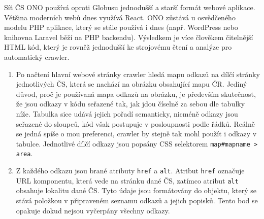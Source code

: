 Síť ČS ONO používá oproti Globusu jednodušší a starší formát webové aplikace.
Většina moderních webů dnes využívá React. ONO zůstává u osvědčeného modelu PHP
aplikace, který se stále používá i dnes (např. WordPress nebo knihovna Laravel
běží na PHP backendu). Výsledkem je více člověkem čitelnější HTML kód, který
je rovněž jednodušší ke strojovému čtení a analýze pro automatický crawler.

\begin{enumerate}
    \item Po načtení hlavní webové stránky crawler hledá mapu odkazů na dílčí stránky
        jednotlivých ČS, která se nachází na obrázku obsahující mapu ČR. Jediný důvod,
        proč je používaná mapa odkazů na obrázku, je především skutečnost, že jsou odkazy
        v kódu seřazené tak, jak jdou číselně za sebou dle tabulky níže. Tabulka sice udává
        jejich pořadí semanticky, nicméně odkazy jsou seřazené do sloupců, kód však postupuje
        v posloupnosti podle řádků. Reálně se jedná spíše o mou preferenci, crawler by stejně
        tak mohl použít i odkazy v tabulce. Jednotlivé dílčí odkazy jsou popsány CSS
        selektorem \texttt{map\#mapname > area}.
    \item Z každého odkazu jsou brané atributy \texttt{href} a \texttt{alt}. Atribut
        \texttt{href} označuje URL komponentu, která vede na stránku dané ČS, zatímco
        atribut \texttt{alt} obsahuje lokalitu dané ČS. Tyto údaje jsou formátovány
        do objektu, který se stává položkou v připraveném seznamu odkazů a jejich popisků.
        Tento bod se opakuje dokud nejsou vyčerpány všechny odkazy.


\end{enumerate}
